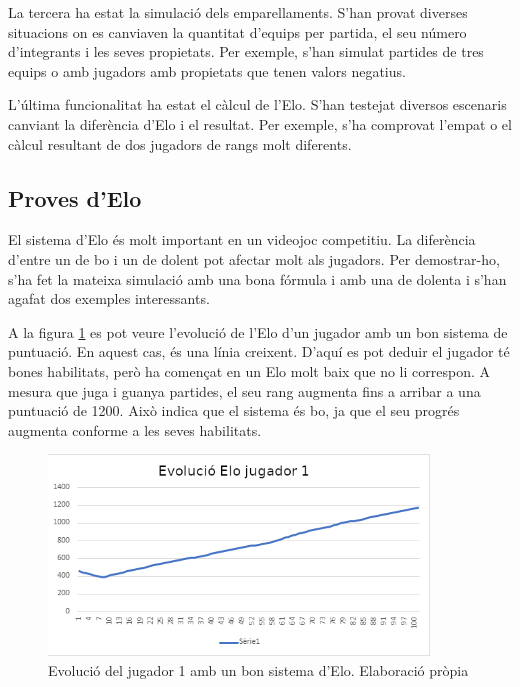 \documentclass[a4paper]{article}
\begin{document}
La tercera ha estat la simulació dels emparellaments. S'han provat diverses situacions on es canviaven la quantitat d'equips per partida, el seu número d'integrants i les seves propietats. Per exemple, s'han simulat partides de tres equips o amb jugadors amb propietats que tenen valors negatius.

\newpage

L'última funcionalitat ha estat el càlcul de l'Elo. S'han testejat diversos escenaris canviant la diferència d'Elo i el resultat. Per exemple, s'ha comprovat l'empat o el càlcul resultant de dos jugadors de rangs molt diferents.

\subsection{Proves d'Elo}
El sistema d'Elo és molt important en un videojoc competitiu. La diferència d'entre un de bo i un de dolent pot afectar molt als jugadors. Per demostrar-ho, s'ha fet la mateixa simulació amb una bona fórmula i amb una de dolenta i s'han agafat dos exemples interessants.

A la figura \ref{fig:EloBo} es pot veure l'evolució de l'Elo d'un jugador amb un bon sistema de puntuació. En aquest cas, és una línia creixent. D'aquí es pot deduir el jugador té bones habilitats, però ha començat en un Elo molt baix que no li correspon. A mesura que juga i guanya partides, el seu rang augmenta fins a arribar a una puntuació de 1200. Això indica que el sistema és bo, ja que el seu progrés augmenta conforme a les seves habilitats.

\begin{figure}[H]
    \centering
    \includegraphics[width=0.9\textwidth]{images/PlayerEloBo.png}
    \caption[Evolució del jugador 1 amb un bon sistema d'Elo]{Evolució del jugador 1 amb un bon sistema d'Elo. Elaboració pròpia}
    \label{fig:EloBo}
\end{figure}
\end{document}
